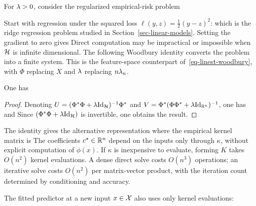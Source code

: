 For $\lambda>0$, consider the regularized empirical-risk problem

Start with regression under the squared loss $\ell(y,z)=\frac{1}{2}(y-z)^2$:
which is the ridge regression problem studied in Section~\ref{sec-linear-models}. 
%
Setting the gradient to zero gives
Direct computation may be impractical or impossible when $\mathcal{H}$ is infinite dimensional. The following Woodbury identity converts the problem into a finite system.
%
This is the feature-space counterpart of~\eqref{eq-linest-woodbury}, with $\Phi$ replacing $X$ and $\lambda$ replacing $n\lambda_n$.

\begin{prop}
	One has
\end{prop}
\begin{proof}
	Denoting $U=( \Phi^*\Phi + \lambda \mathrm{Id}_{\mathcal{H}} )^{-1} \Phi^*$ and $V=\Phi^* ( \Phi \Phi^* + \lambda \mathrm{Id}_{\mathbb{R}^n} )^{-1}$, one has
	and
	Since $( \Phi^*\Phi + \lambda \mathrm{Id}_{\mathcal{H}} )$ is invertible, one obtains the result. 
\end{proof}

The identity gives the alternative representation
where the empirical kernel matrix is
The coefficients $c^\star \in \mathbb{R}^n$ depend on the inputs only through $\kappa$, without explicit computation of $\phi(x)$. If $\kappa$ is inexpensive to evaluate, forming $K$ takes $O(n^2)$ kernel evaluations. A dense direct solve costs $O(n^3)$ operations; an iterative solve costs $O(n^2)$ per matrix-vector product, with the iteration count determined by conditioning and accuracy.

The fitted predictor at a new input $x \in \mathcal{X}$ also uses only kernel evaluations:

